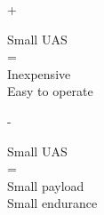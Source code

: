 \documentclass[12pt,svgnames,table,draft=false]{beamer}
\begin{document}
\begin{frame}{+}
\vspace{7em}
\centering
	\begin{tcolorbox}[width=.8\textwidth,colback={gray!10!}]  
	\centering
	\Large
	Small UAS \\
	= \\
	Inexpensive \\
	Easy to operate
	\end{tcolorbox}  
	
\end{frame}


\begin{frame}{-}
	\centering
	\vspace{+5em}
	\begin{tcolorbox}[width=.8\textwidth,colback={gray!10!}]  
	\centering
	\Large
	Small UAS \\
	= \\
	Small payload  \\
	Small endurance 
	\end{tcolorbox}  
\end{frame}
\end{document}
